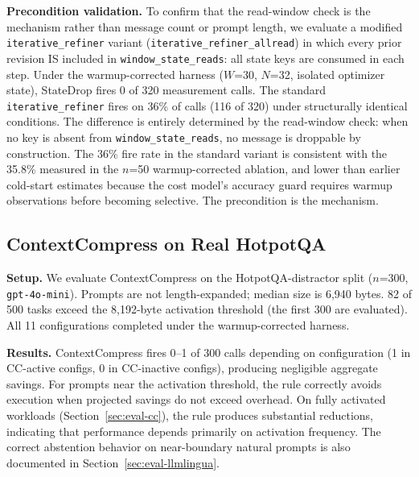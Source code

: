 \textbf{Precondition validation.}
To confirm that the read-window check is the mechanism rather than message count or
prompt length, we evaluate a modified \texttt{iterative\_refiner} variant
(\texttt{iterative\_refiner\_allread}) in which every prior revision IS included in
\texttt{window\_state\_reads}: all state keys are consumed in each step. Under the
warmup-corrected harness ($W$=30, $N$=32, isolated optimizer state), StateDrop fires
0 of 320 measurement calls. The standard \texttt{iterative\_refiner} fires on 36\%
of calls (116 of 320) under structurally identical conditions. The difference is
entirely determined by the read-window check: when no key is absent from
\texttt{window\_state\_reads}, no message is droppable by construction. The 36\% fire
rate in the standard variant is consistent with the 35.8\% measured in the $n$=50
warmup-corrected ablation, and lower than earlier cold-start estimates because the
cost model's accuracy guard requires warmup observations before becoming selective.
The precondition is the mechanism.

\subsection{ContextCompress on Real HotpotQA}
\label{sec:eval-hotpot}

\textbf{Setup.} We evaluate ContextCompress on the HotpotQA-distractor split ($n$=300,
\texttt{gpt-4o-mini}). Prompts are not length-expanded; median size is 6,940 bytes.
82 of 500 tasks exceed the 8,192-byte activation threshold (the first 300 are
evaluated). All 11 configurations completed under the warmup-corrected harness.

\textbf{Results.} ContextCompress fires 0--1 of 300 calls depending on configuration
(1 in CC-active configs, 0 in CC-inactive configs), producing negligible aggregate
savings. For prompts near the activation threshold, the rule correctly avoids
execution when projected savings do not exceed overhead. On fully activated workloads
(Section~\ref{sec:eval-cc}), the rule produces substantial reductions, indicating that
performance depends primarily on activation frequency. The correct abstention behavior
on near-boundary natural prompts is also documented in
Section~\ref{sec:eval-llmlingua}.

